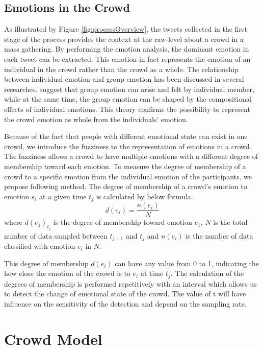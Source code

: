 \subsection{Emotions in the Crowd}
As illustrated by Figure \ref{fig:processOverview}, the tweets collected in the first stage of the process provides the context at the raw-level about a crowd in a mass gathering. By performing the emotion analysis, the dominant emotion in each tweet can be extracted. This emotion in fact represents the emotion of an individual in the crowd rather than the crowd as a whole. The relationship between individual emotion and group emotion has been discussed in several researches. \citet{barsade1998group} suggest that group emotion can arise and felt by individual member, while at the same time, the group emotion can be shaped by the compositional effects of individual emotions. This theory confirms the possibility to represent the crowd emotion as whole from the individuals' emotion.

Because of the fact that people with different emotional state can exist in one crowd, we introduce the fuzziness to the representation of emotions in a crowd. The fuzziness allows a crowd to have multiple emotions with a different degree of membership toward each emotion. To measure the degree of membership of a crowd to a specific emotion from the individual emotion of the participants, we propose following method. The degree of membership of a crowd's emotion to emotion \(e_i\) at a given time \(t_j\) is calculated by below formula.
\[
	d(e_i) = \frac{n(e_i)}{N}
\]
where \(d(e_1)_{t_j}\) is the degree of membership toward emotion \(e_1\), \(N\) is the total number of data sampled between \(t_{j-1}\) and \(t_j\) and \(n(e_i)\) is the number of data classified with emotion \(e_i\) in \(N\).

This degree of membership \(d(e_i)\) can have any value from 0 to 1, indicating the how close the emotion of the crowd is to \(e_i\) at time \(t_j\). The calculation of the degrees of membership is performed repetitively with an interval which allows us to detect the change of emotional state of the crowd. The value of t will have influence on the sensitivity of the detection and depend on the sampling rate.

\section{Crowd Model}

